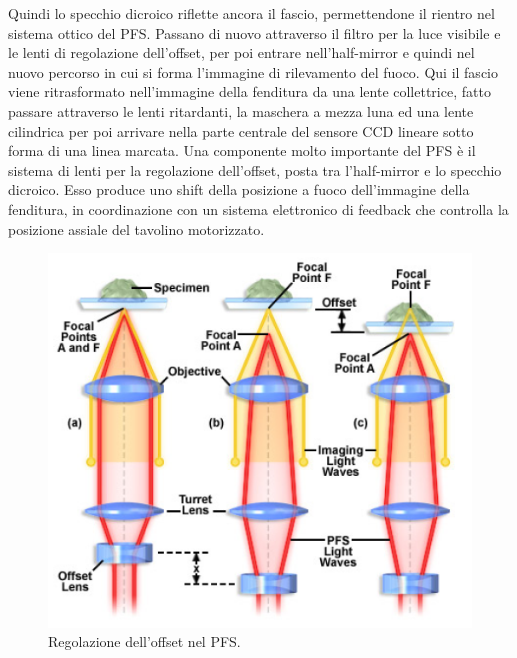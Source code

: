 \begin{itemize}
Quindi lo specchio dicroico riflette ancora il fascio, permettendone il rientro nel sistema ottico del PFS.
Passano di nuovo attraverso il filtro per la luce visibile e le lenti di regolazione dell'offset, per poi entrare nell'half-mirror e quindi nel nuovo percorso in cui si forma l'immagine di rilevamento del fuoco. 
Qui il fascio viene ritrasformato nell'immagine della fenditura da una lente collettrice, fatto passare attraverso le lenti ritardanti, la maschera a mezza luna ed una lente cilindrica per poi arrivare nella parte centrale del sensore CCD lineare sotto forma di una linea marcata.
Una componente molto importante del PFS è il sistema di lenti per la regolazione dell'offset, posta tra l'half-mirror e lo specchio dicroico.
Esso produce uno shift della posizione a fuoco dell'immagine della fenditura, in coordinazione con un sistema elettronico di feedback che controlla la posizione assiale del tavolino motorizzato.

\begin{figure}
 \centering
 \includegraphics[scale=.40]{img/CAP2PFS.png}
 \caption{\small{Regolazione dell'offset nel PFS.}}
 \label{fig:PFS}
\end{figure}


\end{itemize}
